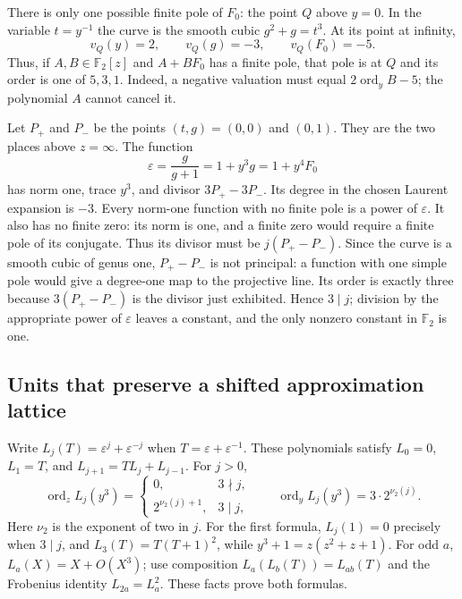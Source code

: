 \documentclass[11pt,a4paper]{article}
\theoremstyle{definition}
\theoremstyle{remark}
\begin{document}
There is only one possible finite pole of $F_0$: the point $Q$ above
$y=0$. In the variable $t=y^{-1}$ the curve is the smooth cubic
$g^2+g=t^3$. At its point at infinity,
\[
                v_Q(y)=2,\qquad v_Q(g)=-3,\qquad v_Q(F_0)=-5.
\]
Thus, if $A,B\in\mathbb F_2[z]$ and $A+BF_0$ has a finite pole,
that pole is at $Q$ and its order is one of $5,3,1$.
Indeed, a negative valuation must equal $2\operatorname{ord}_yB-5$;
the polynomial $A$ cannot cancel it.

Let $P_+$ and $P_-$ be the points $(t,g)=(0,0)$ and $(0,1)$.
They are the two places above $z=\infty$. The function
\[
 \varepsilon=\frac{g}{g+1}=1+y^3g=1+y^4F_0
\]
has norm one, trace $y^3$, and divisor $3P_+-3P_-$. Its degree in the
chosen Laurent expansion is $-3$.
Every norm-one function with no finite pole is a power of
$\varepsilon$. It also has no finite zero: its norm is one, and a
finite zero would require a finite pole of its conjugate. Thus its
divisor must be $j(P_+-P_-)$.
Since the curve is a smooth cubic of genus one, $P_+-P_-$ is not
principal: a function with one simple pole would give a degree-one map
to the projective line. Its order is exactly three because
$3(P_+-P_-)$ is the divisor just exhibited. Hence $3\mid j$;
division by the appropriate power of $\varepsilon$ leaves a constant,
and the only nonzero constant in $\mathbb F_2$ is one.

\subsection{Units that preserve a shifted approximation lattice}

Write $L_j(T)=\varepsilon^j+\varepsilon^{-j}$ when
$T=\varepsilon+\varepsilon^{-1}$. These polynomials satisfy
$L_0=0$, $L_1=T$, and $L_{j+1}=TL_j+L_{j-1}$. For $j>0$,
\begin{equation}\label{eq:t98orders}
 \operatorname{ord}_z L_j(y^3)=
 \begin{cases}
  0,&3\nmid j,\\
  2^{\nu_2(j)+1},&3\mid j,
 \end{cases}
 \qquad
 \operatorname{ord}_yL_j(y^3)=3\cdot2^{\nu_2(j)}.
\end{equation}
Here $\nu_2$ is the exponent of two in $j$. For the first formula,
$L_j(1)=0$ precisely when $3\mid j$, and
$L_3(T)=T(T+1)^2$, while $y^3+1=z(z^2+z+1)$.
For odd $a$, $L_a(X)=X+O(X^3)$; use composition
$L_a(L_b(T))=L_{ab}(T)$ and the Frobenius identity
$L_{2a}=L_a^2$. These facts prove both formulas.
\end{document}
